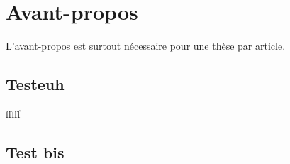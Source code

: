 \chapter*{Avant-propos}         %

L'avant-propos est surtout nécessaire pour une thèse par article.


\section{Testeuh}

fffff


\section{Test bis}